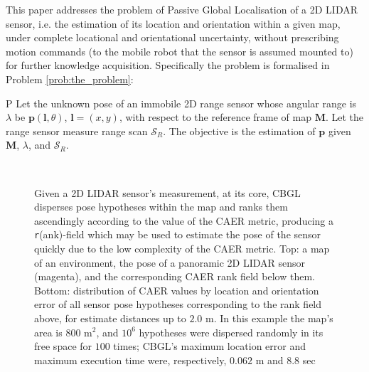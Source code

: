 This paper addresses the problem of Passive Global Localisation of a 2D LIDAR
sensor, i.e. the estimation of its location and orientation within a given map,
under complete locational and orientational uncertainty, without prescribing
motion commands (to the mobile robot that the sensor is assumed mounted to) for
further knowledge acquisition. Specifically the problem is formalised in
Problem \ref{prob:the_problem}:

\begin{customprb}{P}
  \label{prob:the_problem}
  Let the unknown pose of an immobile 2D range sensor whose angular range is
  $\lambda$ be $\bm{p}(\bm{l},\theta)$, $\bm{l} = (x,y)$, with respect to the
  reference frame of map $\bm{M}$. Let the range sensor measure range scan
  $\mathcal{S}_R$. The objective is the estimation of $\bm{p}$ given $\bm{M}$,
  $\lambda$, and $\mathcal{S}_R$.
\end{customprb}

\begin{figure}\vspace{0.4em}
  \subfloat{    \label{fig:a}} \vspace{-1.7cm}\\
  \subfloat{\hspace{-0.3cm} \label{fig:b}}
  \caption{\small
           Given a 2D LIDAR sensor's measurement, at its core, CBGL disperses
           pose hypotheses within the map and ranks them ascendingly according
           to the value of the CAER metric, producing a \texttt{r}(ank)-field
           which may be used to estimate the pose of the sensor quickly due to
           the low complexity of the CAER metric.
           Top: a map of an environment, the pose of a panoramic 2D LIDAR sensor
           (magenta), and the corresponding CAER rank field below them.
           Bottom: distribution of CAER values by location and orientation
           error of all sensor pose hypotheses corresponding to the rank field
           above, for estimate distances up to $2.0$ m.
           In this example the map's area is $800$ m$^2$, and $10^6$ hypotheses
           were dispersed randomly in its free space for $100$ times; CBGL's
           maximum location error and maximum execution time were,
           respectively, $0.062$ m and $8.8$ sec
           }
  \vspace{-0.75cm}
  \label{fig:AB}
\end{figure}
